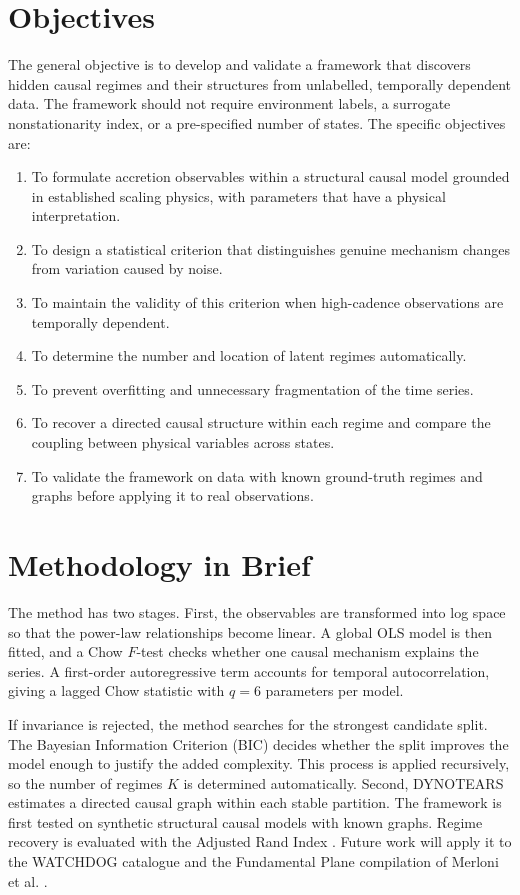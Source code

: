 \section{Objectives}
The general objective is to develop and validate a framework that discovers hidden
causal regimes and their structures from unlabelled, temporally dependent data. The
framework should not require environment labels, a surrogate nonstationarity index,
or a pre-specified number of states. The specific objectives are:
\begin{enumerate}
    \item To formulate accretion observables within a structural causal model grounded
    in established scaling physics, with parameters that have a physical interpretation.
    \item To design a statistical criterion that distinguishes genuine mechanism
    changes from variation caused by noise.
    \item To maintain the validity of this criterion when high-cadence observations
    are temporally dependent.
    \item To determine the number and location of latent regimes automatically.
    \item To prevent overfitting and unnecessary fragmentation of the time series.
    \item To recover a directed causal structure within each regime and compare the
    coupling between physical variables across states.
    \item To validate the framework on data with known ground-truth regimes and graphs
    before applying it to real observations.
\end{enumerate}

\section{Methodology in Brief}
The method has two stages. First, the observables are transformed into log space so
that the power-law relationships become linear. A global OLS model is then fitted,
and a Chow $F$-test \cite{chow1960} checks whether one causal mechanism explains the
series. A first-order autoregressive term accounts for temporal autocorrelation,
giving a lagged Chow statistic with $q=6$ parameters per model.

If invariance is rejected, the method searches for the strongest candidate split.
The Bayesian Information Criterion (BIC) \cite{schwarz1978} decides whether the
split improves the model enough to justify the added complexity. This process is
applied recursively, so the number of regimes $K$ is determined automatically.
Second, DYNOTEARS estimates a directed causal graph within each stable partition.
The framework is first tested on synthetic structural causal models with known
graphs. Regime recovery is evaluated with the Adjusted Rand Index
\cite{hubert1985}. Future work will apply it to the WATCHDOG catalogue
\cite{tetarenko2016} and the Fundamental Plane compilation of Merloni et al.
\cite{merloni2003}.

